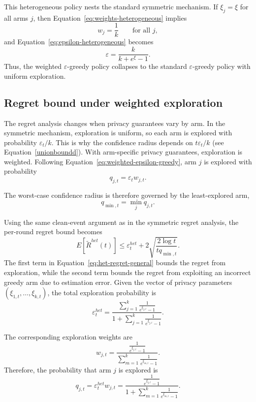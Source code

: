 \documentclass[mksc,nonblindrev]{informs3}
\begin{document}
\begin{APPENDICES}
This heterogeneous policy nests the standard symmetric mechanism. If $\xi_j=\xi$ for all arms $j$, then Equation~\eqref{eq:weights-heterogeneous}
implies
\[
w_j=\frac{1}{k}
\qquad \text{for all } j,
\]
and Equation~\eqref{eq:epsilon-heterogeneous} becomes
\[
\varepsilon
=
\frac{k}{k+e^\xi-1}.
\]
Thus, the weighted $\varepsilon$-greedy policy collapses to the standard $\varepsilon$-greedy policy with uniform exploration.

\subsection{Regret bound under weighted exploration}
The regret analysis changes when privacy guarantees vary by arm. In the symmetric mechanism, exploration is uniform, so each arm is explored with probability $\varepsilon_t/k$. This is why the confidence radius depends on $t\varepsilon_t/k$ (see Equation~\ref{unionboundd}). With arm-specific privacy guarantees, exploration is weighted. Following Equation~\eqref{eq:weighted-epsilon-greedy}, arm $j$ is explored with probability
\begin{equation}
\label{eq:qjt-def}
q_{j,t}
=
\varepsilon_t w_{j,t}.
\end{equation}

The worst-case confidence radius is therefore governed by the least-explored arm,
\begin{equation}
\label{eq:qmin-def}
q_{\min,t}
=
\min_j q_{j,t}.
\end{equation}

Using the same clean-event argument as in the symmetric regret analysis, the per-round regret bound becomes
\begin{equation}
\label{eq:het-regret-general}
E[\tilde R^{het}(t)]
\leq
\varepsilon_t^{het}
+
2\sqrt{
\frac{2\log t}{tq_{\min,t}}
}.
\end{equation}
The first term in Equation~\eqref{eq:het-regret-general} bounds the regret from exploration, while the second term bounds the regret from exploiting an incorrect greedy arm due to estimation error. Given the vector of privacy parameters $(\xi_{1,t},\dots,\xi_{k,t})$, the total exploration probability is
\begin{equation}
\label{eq:epsilon-het}
\varepsilon_t^{het}
=
\frac{
\sum_{j=1}^k \frac{1}{e^{\xi_{j,t}}-1}
}{
1+\sum_{j=1}^k \frac{1}{e^{\xi_{j,t}}-1}
}.
\end{equation}

The corresponding exploration weights are
\begin{equation}
\label{eq:weights-het-time}
w_{j,t}
=
\frac{
\frac{1}{e^{\xi_{j,t}}-1}
}{
\sum_{m=1}^k \frac{1}{e^{\xi_{m,t}}-1}
}.
\end{equation}
Therefore, the probability that arm $j$ is explored is
\begin{equation}
\label{eq:qjt-privacy}
q_{j,t}
=
\varepsilon_t^{het}w_{j,t}
=
\frac{
\frac{1}{e^{\xi_{j,t}}-1}
}{
1+\sum_{m=1}^k \frac{1}{e^{\xi_{m,t}}-1}
}.
\end{equation}



\end{APPENDICES}
\end{document}
